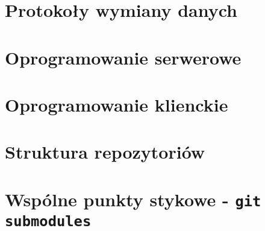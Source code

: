 \section{Protokoły wymiany danych}

\section{Oprogramowanie serwerowe}

\section{Oprogramowanie klienckie}

\section{Struktura repozytoriów}

\section{Wspólne punkty stykowe - \texttt{git submodules}}

